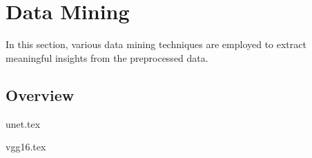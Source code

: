\section{Data Mining}\label{data_mining}

In this section, various data mining techniques are employed to extract meaningful insights from the preprocessed data.

\subsection{Overview}\label{overview}


{unet.tex}

{vgg16.tex}